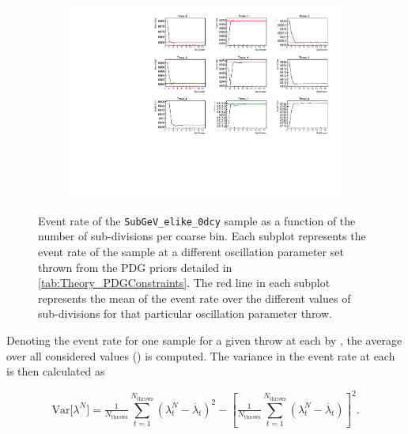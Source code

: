 \begin{figure}[h]
  \begin{subfigure}[t]{\textwidth}
    \includegraphics[width=\textwidth, trim={0mm 0mm 0mm 0mm}, clip,page=1]{Figures/Oscillation/EventRate_VariableGraphs.pdf}
  \end{subfigure}
  \caption{Event rate of the \texttt{SubGeV\_elike\_0dcy} sample as a function of the number of sub-divisions per coarse bin. Each subplot represents the event rate of the sample at a different oscillation parameter set thrown from the PDG priors detailed in \autoref{tab:Theory_PDGConstraints}. The red line in each subplot represents the mean of the event rate over the different values of sub-divisions for that particular oscillation parameter throw.}
  \label{fig:Oscillation_SK_EventRateVariable}
\end{figure}

Denoting the event rate for one sample for a given throw  at each  by , the average over all considered  values () is computed. The variance in the event rate at each  is then calculated as

\begin{equation}
  \mathrm{Var}\Big[\lambda^{N}\Big] = \tfrac{1}{N_\mathrm{throws}} \sum_{t=1}^{N_\mathrm{throws}} \left(\lambda_t^{N} - \overline \lambda_t\right)^2 - \left[\tfrac{1}{N_\mathrm{throws}} \sum_{t=1}^{N_\mathrm{throws}} \left(\lambda_t^{N} - \overline \lambda_t\right)\right]^2 .
  \label{eq:Oscillation_SK_Variance}
\end{equation}

